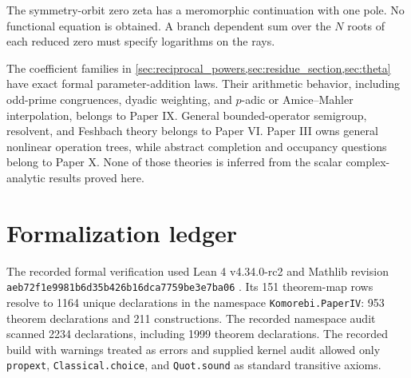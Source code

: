\documentclass[11pt,letterpaper]{article}
\theoremstyle{definition}
\theoremstyle{remark}
\newcommand{\leanname}[1]{\nolinkurl{#1}}
\begin{document}
The symmetry-orbit zero zeta has a meromorphic continuation with one pole. No
functional equation is obtained. A branch dependent sum over the $N$ roots of
each reduced zero must specify logarithms on the rays.

The coefficient families in
\cref{sec:reciprocal_powers,sec:residue_section,sec:theta} have exact formal
parameter-addition laws. Their arithmetic behavior, including odd-prime
congruences, dyadic weighting, and $p$-adic or Amice--Mahler interpolation,
belongs to Paper IX. General bounded-operator semigroup, resolvent, and
Feshbach theory belongs to Paper VI. Paper III owns general nonlinear
operation trees, while abstract completion and occupancy questions belong to
Paper X. None of those theories is inferred from the scalar complex-analytic
results proved here.

\section{Formalization ledger}\label{sec:formalization_ledger}

The recorded formal verification used Lean 4 v4.34.0-rc2 and Mathlib revision
\leanname{aeb72f1e9981b6d35b426b16dca7759be3e7ba06}
\cite{deMouraUllrich2021,mathlib2020}. Its 151 theorem-map rows resolve to
1164 unique declarations in the namespace \leanname{Komorebi.PaperIV}:
953 theorem declarations and 211 constructions. The recorded namespace audit scanned
2234 declarations, including 1999 theorem declarations. The recorded build with warnings treated as errors
and supplied kernel audit allowed only
\leanname{propext}, \leanname{Classical.choice}, and
\leanname{Quot.sound} as standard transitive axioms.
\end{document}
